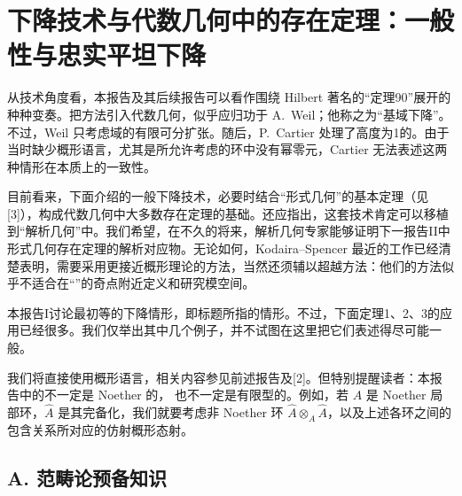 \chapter{下降技术与代数几何中的存在定理：一般性与忠实平坦下降}
从技术角度看，本报告及其后续报告可以看作围绕 Hilbert 著名的“定理90”展开的种种变奏。把方法引入代数几何，似乎应归功于 A.~Weil；他称之为“基域下降”。不过，Weil 只考虑域的有限可分扩张。随后，P.~Cartier 处理了高度为1的。由于当时缺少概形语言，尤其是所允许考虑的环中没有幂零元，Cartier 无法表述这两种情形在本质上的一致性。

目前看来，下面介绍的一般下降技术，必要时结合“形式几何”的基本定理（见[3]），构成代数几何中大多数存在定理的基础。还应指出，这套技术肯定可以移植到“解析几何”中。我们希望，在不久的将来，解析几何专家能够证明下一报告II中形式几何存在定理的解析对应物。无论如何，Kodaira--Spencer 最近的工作已经清楚表明，需要采用更接近概形理论的方法，当然还须辅以超越方法：他们的方法似乎不适合在“”的奇点附近定义和研究模空间。

本报告I讨论最初等的下降情形，即标题所指的情形。不过，下面定理1、2、3的应用已经很多。我们仅举出其中几个例子，并不试图在这里把它们表述得尽可能一般。

我们将直接使用概形语言，相关内容参见前述报告及[2]。但特别提醒读者：本报告中的不一定是 Noether 的，
也不一定是有限型的。例如，若 $A$ 是 Noether 局部环，$\widehat A$ 是其完备化，我们就要考虑非 Noether 环 $\widehat A\otimes_A\widehat A$，以及上述各环之间的包含关系所对应的仿射概形态射。

\section*{A. 范畴论预备知识}
